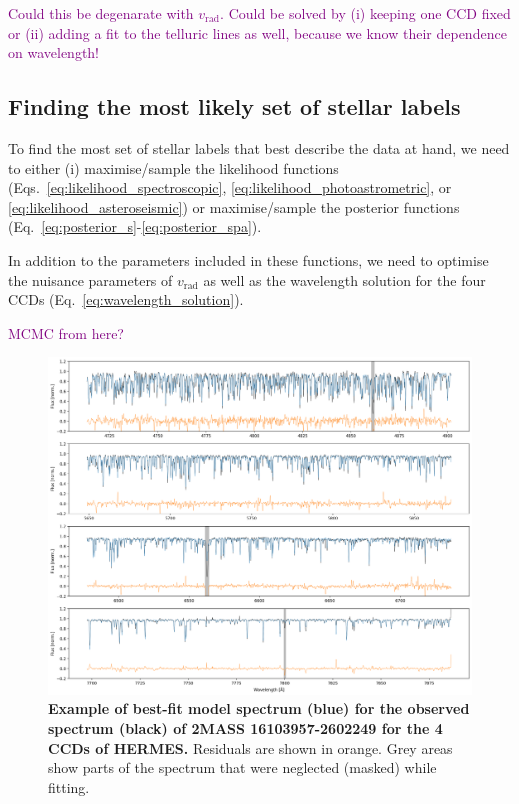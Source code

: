 \documentclass[
  journal=pasa,
  manuscript=research-paper, %
  year=2021,
  volume=37,
]{cup-journal}
\newcommand{\SB}[1]{{\textcolor{purple}{#1}}}
\newcommand{\vrad}{$v_\mathrm{rad}$\xspace}
\begin{document}
\SB{Could this be degenarate with \vrad. Could be solved by (i) keeping one CCD fixed or (ii) adding a fit to the telluric lines as well, because we know their dependence on wavelength!}

\subsection{Finding the most likely set of stellar labels} \label{subsec:finding_best_labels}

To find the most set of stellar labels that best describe the data at hand, we need to either (i) maximise/sample the likelihood functions
(Eqs.~\ref{eq:likelihood_spectroscopic}, \ref{eq:likelihood_photoastrometric}, or \ref{eq:likelihood_asteroseismic}) or maximise/sample the posterior functions (Eq.~\ref{eq:posterior_s}-\ref{eq:posterior_spa}).

In addition to the parameters included in these functions, we need to optimise the nuisance parameters of \vrad as well as the wavelength solution for the four CCDs (Eq.~\ref{eq:wavelength_solution}).

\SB{MCMC from here?}

\begin{figure}[hbt!]
 \centering
 \includegraphics[width=\textwidth]{figures/150606003401143_mcmc_median.png}
 \caption{
 \textbf{Example of best-fit model spectrum (blue) for the observed spectrum (black) of 2MASS 16103957-2602249 for the 4 CCDs of HERMES.}
 Residuals are shown in orange. Grey areas show parts of the spectrum that were neglected (masked) while fitting.
 }
 \label{fig:best_fit_spectrum}
\end{figure}
\end{document}
